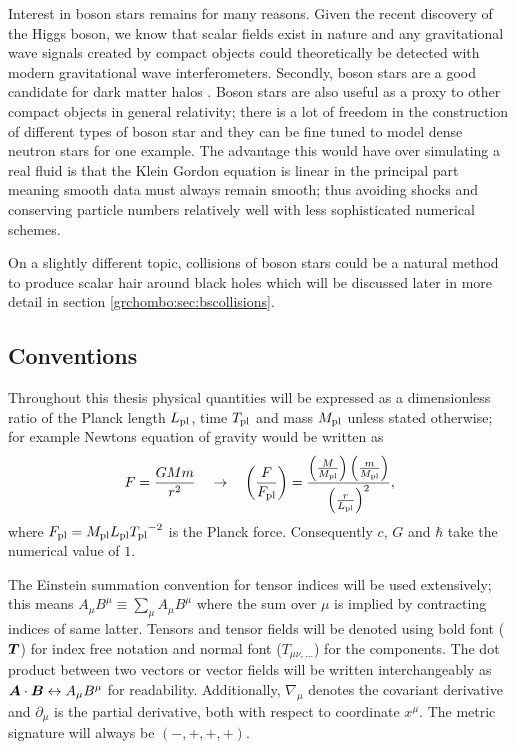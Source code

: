 Interest in boson stars remains for many reasons. Given the recent discovery of the Higgs boson, we know that scalar fields exist in nature and any gravitational wave signals created by compact objects could theoretically be detected with modern gravitational wave interferometers. Secondly, boson stars are a good candidate for dark matter halos \cite{lee1996galactic} \cite{schunck2003general}. Boson stars are also useful as a proxy to other compact objects in general relativity; there is a lot of freedom in the construction of different types of boson star and they can be fine tuned to model dense neutron stars for one example. The advantage this would have over simulating a real fluid is that the Klein Gordon equation is linear in the principal part meaning smooth data must always remain smooth; thus avoiding shocks and conserving particle numbers relatively well with less sophisticated numerical schemes. 

On a slightly different topic, collisions of boson stars could be a natural method to produce scalar hair around black holes which will be discussed later in more detail in section \ref{grchombo:sec:bscollisions}.

\subsection{Conventions} \label{intro:sec:conventions}
Throughout this thesis physical quantities will be expressed as a dimensionless ratio of the Planck length ${L_{\rm pl}}$, time ${T_{\rm pl}}$ and mass ${M_{\rm pl}}$ unless stated otherwise; for example Newtons equation of gravity would be written as
\begin{equation}
F=\frac{GMm}{r^2} \quad \rightarrow \quad\left(\frac{F}{{F_{\rm pl}}}\right) = \frac{\left(\frac{M}{{M_{\rm pl}}}\right)  \left(\frac{m}{{M_{\rm pl}}}\right)}{\left(\frac{r}{{L_{\rm pl}}}\right)^2},
\end{equation}
where ${F_{\rm pl}} = {M_{\rm pl}}{L_{\rm pl}}{T_{\rm pl}}^{-2}$ is the Planck force. Consequently $c$, $G$ and $\hbar$ take the numerical value of $1$.

The Einstein summation convention for tensor indices will be used extensively; this means $A_\mu B^\mu \equiv \sum_{\mu} A_\mu B^\mu$ where the sum over $\mu$ is implied by contracting indices of same latter. Tensors and tensor fields will be denoted using bold font ($\boldsymbol{T}$) for
index free notation and normal font ($T_{\mu\nu,...}$) for the components.
The dot product between two vectors or vector fields will be written interchangeably as $\boldsymbol{A} \cdot \boldsymbol{B} \leftrightarrow {A}_\mu {B}^\mu$ for readability.
Additionally, $\nabla_\mu$ denotes the covariant derivative and $\partial_\mu$
is the partial derivative, both with respect to coordinate $x^\mu$. The metric signature will always be $(-,+,+,+)$. 

